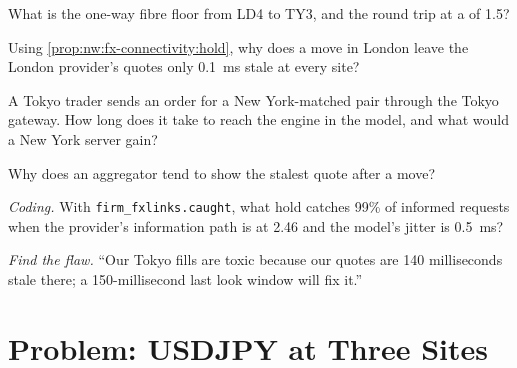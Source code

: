 \begin{exercise}[$\star$]\label{exo:nw:fx-connectivity:3}
What is the one-way fibre floor from LD4 to TY3, and the round trip at a  of 1.5?
\end{exercise}

\begin{exercise}[$\star\star$]\label{exo:nw:fx-connectivity:4}
Using \cref{prop:nw:fx-connectivity:hold}, why does a move in London leave the London provider's quotes only
\qty{0.1}{\milli\second} stale at every site?
\end{exercise}

\begin{exercise}[$\star\star$]\label{exo:nw:fx-connectivity:5}
A Tokyo trader sends an order for a New York-matched pair through the Tokyo gateway. How long does it take to reach the engine in the
model, and what would a New York server gain?
\end{exercise}

\begin{exercise}[$\star\star$]\label{exo:nw:fx-connectivity:6}
Why does an aggregator tend to show the stalest quote after a move?
\end{exercise}

\begin{exercise}[$\star\star\star$]\label{exo:nw:fx-connectivity:7}
\emph{Coding.} With \texttt{firm\_fxlinks.caught}, what hold catches 99\% of informed requests when the provider's information path is
at 2.46 and the model's jitter is \qty{0.5}{\milli\second}?
\end{exercise}

\begin{exercise}[$\star\star\star$]\label{exo:nw:fx-connectivity:8}
\emph{Find the flaw.} ``Our Tokyo fills are toxic because our quotes are 140 milliseconds stale there; a 150-millisecond last look
window will fix it.''
\end{exercise}

\section{Problem: USDJPY at Three Sites}

